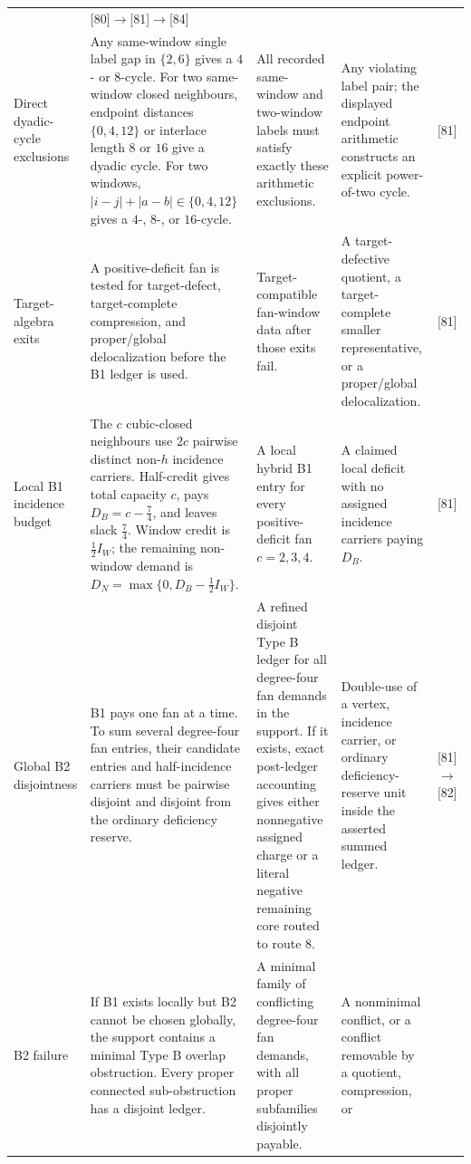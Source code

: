 \documentclass[11pt]{article}
\begin{document}
{\begin{longtable}{L{0.16\textwidth} L{0.19\textwidth} L{0.23\textwidth} L{0.23\textwidth} L{0.10\textwidth}}
&
[80]\(\to\)[81]\(\to\)[84]\\
\addlinespace
Direct dyadic-cycle exclusions
&
Any same-window single label gap in \(\{2,6\}\) gives a \(4\)- or \(8\)-cycle.
For two same-window closed neighbours, endpoint distances
\(\{0,4,12\}\) or interlace length \(8\) or \(16\) give a dyadic cycle.  For
two windows, \(|i-j|+|a-b|\in\{0,4,12\}\) gives a \(4\)-, \(8\)-, or
\(16\)-cycle.
&
All recorded same-window and two-window labels must satisfy exactly these
arithmetic exclusions.
&
Any violating label pair; the displayed endpoint arithmetic constructs an
explicit power-of-two cycle.
&
[81]\\
\addlinespace
Target-algebra exits
&
A positive-deficit fan is tested for target-defect, target-complete compression,
and proper/global delocalization before the B1 ledger is used.
&
Target-compatible fan-window data after those exits fail.
&
A target-defective quotient, a target-complete smaller representative, or a
proper/global delocalization.
&
[81]\\
\addlinespace
Local B1 incidence budget
&
The \(c\) cubic-closed neighbours use \(2c\) pairwise distinct non-\(h\)
incidence carriers.  Half-credit gives total capacity \(c\), pays
\(D_B=c-\frac74\), and leaves slack \(\frac74\).  Window credit is
\(\frac12 I_W\); the remaining non-window demand is
\(D_N=\max\{0,D_B-\frac12 I_W\}\).
&
A local hybrid B1 entry for every positive-deficit fan \(c=2,3,4\).
&
A claimed local deficit with no assigned incidence carriers paying
\(D_B\).
&
[81]\\
\addlinespace
Global B2 disjointness
&
B1 pays one fan at a time.  To sum several degree-four fan entries, their
candidate entries and half-incidence carriers must be pairwise disjoint and
disjoint from the ordinary deficiency reserve.
&
A refined disjoint Type B ledger for all degree-four fan demands in the
support.  If it exists, exact post-ledger accounting gives either nonnegative
assigned charge or a literal negative remaining core routed to route 8.
&
Double-use of a vertex, incidence carrier, or ordinary deficiency-reserve unit
inside the asserted summed ledger.
&
[81]\(\to\)[82]\\
\addlinespace
B2 failure
&
If B1 exists locally but B2 cannot be chosen globally, the support contains a
minimal Type B overlap obstruction.  Every proper connected sub-obstruction has
a disjoint ledger.
&
A minimal family of conflicting degree-four fan demands, with all proper
subfamilies disjointly payable.
&
A nonminimal conflict, or a conflict removable by a quotient, compression, or

\end{longtable}}
\end{document}
